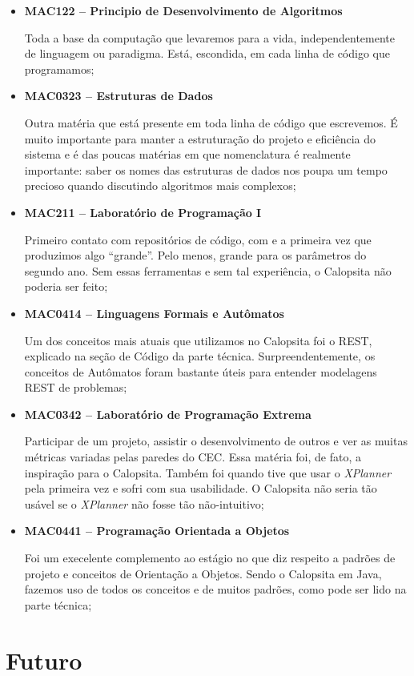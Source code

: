 \documentclass[titlepage,a4paper]{article}
\newcommand{\calopsita}{Calopsita}
\begin{document}
\begin{itemize}
	\item{\textbf{MAC122 -- Principio de Desenvolvimento de Algoritmos}

		Toda a base da computação que levaremos para a vida, independentemente de linguagem ou paradigma. Está, escondida, em cada linha de código que programamos;}
	\item{\textbf{MAC0323 -- Estruturas de Dados} 

		Outra matéria que está presente em toda linha de código que escrevemos. É muito importante para manter a estruturação do projeto e eficiência do sistema e é das poucas matérias em que nomenclatura é realmente importante: saber os nomes das estruturas de dados nos poupa um tempo precioso quando discutindo algoritmos mais complexos;}
	\item{\textbf{MAC211 -- Laboratório de Programação I} 

		Primeiro contato com repositórios de código, com \latex{} e a primeira vez que produzimos algo ``grande''. Pelo menos, grande para os parâmetros do segundo ano. Sem essas ferramentas e sem tal experiência, o \calopsita{} não poderia ser feito;}
	\item{\textbf{MAC0414 -- Linguagens Formais e Autômatos} 

		Um dos conceitos mais atuais que utilizamos no \calopsita{} foi o REST, explicado na seção de Código da parte técnica. Surpreendentemente, os conceitos de Autômatos foram bastante úteis para entender modelagens REST de problemas;}
	\item{\textbf{MAC0342 -- Laboratório de Programação Extrema}

		Participar de um projeto, assistir o desenvolvimento de outros e ver as muitas métricas variadas pelas paredes do CEC. Essa matéria foi, de fato, a inspiração para o \calopsita{}. Também foi quando tive que usar o \textit{XPlanner} pela primeira vez e sofri com sua usabilidade. O \calopsita{} não seria tão usável se o \textit{XPlanner} não fosse tão não-intuitivo;}
	\item{\textbf{MAC0441 -- Programação Orientada a Objetos}

		Foi um execelente complemento ao estágio no que diz respeito a padrões de projeto e conceitos de Orientação a Objetos. Sendo o \calopsita{} em Java, fazemos uso de todos os conceitos e de muitos padrões, como pode ser lido na parte técnica;}
\end{itemize}

\section{Futuro}
\end{document}
